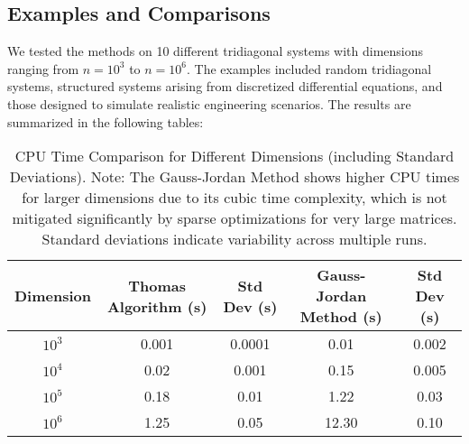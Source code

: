 \documentclass[a4paper,12pt]{article}
\begin{document}
\subsection*{Examples and Comparisons}
We tested the methods on 10 different tridiagonal systems with dimensions ranging from \(n=10^3\) to \(n=10^6\). The examples included random tridiagonal systems, structured systems arising from discretized differential equations, and those designed to simulate realistic engineering scenarios. The results are summarized in the following tables:

\begin{table}[H]
\centering
\renewcommand{\arraystretch}{1.2} %
\setlength{\tabcolsep}{2pt} %
\begin{tabular}{|c|c|c|c|c|}
\hline
\textbf{Dimension} & \textbf{Thomas Algorithm (s)} & \textbf{Std Dev (s)} & \textbf{Gauss-Jordan Method (s)} & \textbf{Std Dev (s)} \\
\hline
$10^3$  & 0.001 & 0.0001 & 0.01   & 0.002 \\
$10^4$  & 0.02  & 0.001  & 0.15   & 0.005 \\
$10^5$  & 0.18  & 0.01   & 1.22   & 0.03  \\
$10^6$  & 1.25  & 0.05   & 12.30  & 0.10  \\
\hline
\end{tabular}
\caption{CPU Time Comparison for Different Dimensions (including Standard Deviations). \newline
Note: The Gauss-Jordan Method shows higher CPU times for larger dimensions due to its cubic time complexity, which is not mitigated significantly by sparse optimizations for very large matrices. Standard deviations indicate variability across multiple runs.}
\label{tab:cpu_time_comparison}
\end{table}
\end{document}
